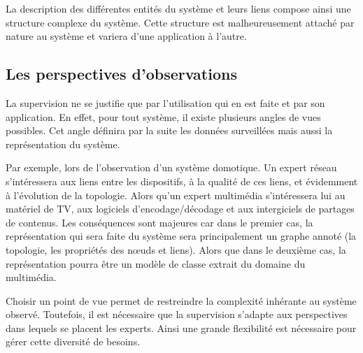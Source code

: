La description des différentes entités du système et leurs liens compose ainsi une structure complexe du système. Cette structure est malheureusement attaché par nature au système et variera d'une application à l'autre.

\subsection{Les perspectives d'observations}\label{sec:intro:problematique:observation}
La supervision ne se justifie que par l'utilisation qui en est faite et par son application. En effet, pour tout système, il existe plusieurs angles de vues possibles. Cet angle définira par la suite les données surveillées mais aussi la représentation du système.

Par exemple, lors de l'observation d'un système domotique. Un expert réseau s'intéressera aux liens entre les dispositifs, à la qualité de ces liens, et évidemment à l'évolution de la topologie. Alors qu'un expert multimédia s'intéressera lui au matériel de TV, aux logiciels d'encodage/décodage et aux intergiciels de partages de contenus. Les conséquences sont majeures car dans le premier cas, la représentation qui sera faite du système sera principalement un graphe annoté (la topologie, les propriétés des nœuds et liens). Alors que dans le deuxième cas, la représentation pourra être un modèle de classe extrait du domaine du multimédia.

Choisir un point de vue permet de restreindre la complexité inhérante au système observé. Toutefois, il est nécessaire que la supervision s'adapte aux perspectives dans lequels se placent les experts. Ainsi une grande flexibilité est nécessaire pour gérer cette diversité de besoins.


